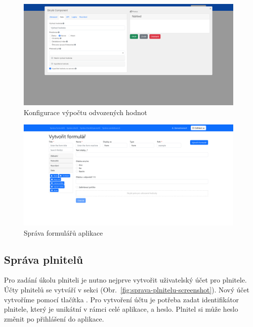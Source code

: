 \begin{figure}[H]
    \includegraphics[width=\textwidth]{../img/screenshots/odvozena-hodnota}
    \caption{Konfigurace výpočtu odvozených hodnot}\label{fig:odvozena-hodnota}
\end{figure}

\begin{figure}[H]
    \includegraphics[width=\textwidth]{../img/screenshots/tvorba-formulare}
    \caption{Správa formulářů aplikace}\label{fig:tvorba-formulare-screenshot}
\end{figure}

\subsection{Správa plnitelů}\label{subsec:sprava-plnitelu}

Pro zadání úkolu plniteli je nutno nejprve vytvořit uživatelský účet pro plnitele.
Účty plnitelů se vytváří v sekci  (Obr.\ \ref{fig:sprava-plnitelu-screenshot}).
Nový účet vytvoříme pomocí tlačítka .
Pro vytvoření účtu je potřeba zadat identifikátor plnitele, který je unikátní v rámci celé aplikace, a heslo.
Plnitel si může heslo změnit po přihlášení do aplikace.

